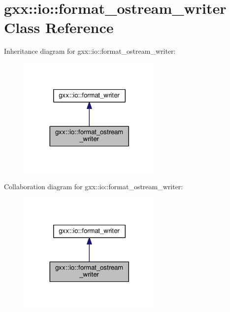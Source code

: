 \hypertarget{classgxx_1_1io_1_1format__ostream__writer}{}\section{gxx\+:\+:io\+:\+:format\+\_\+ostream\+\_\+writer Class Reference}
\label{classgxx_1_1io_1_1format__ostream__writer}


Inheritance diagram for gxx\+:\+:io\+:\+:format\+\_\+ostream\+\_\+writer\+:
\nopagebreak
\begin{figure}[H]
\begin{center}
\leavevmode
\includegraphics[width=200pt]{classgxx_1_1io_1_1format__ostream__writer__inherit__graph}
\end{center}
\end{figure}


Collaboration diagram for gxx\+:\+:io\+:\+:format\+\_\+ostream\+\_\+writer\+:
\nopagebreak
\begin{figure}[H]
\begin{center}
\leavevmode
\includegraphics[width=200pt]{classgxx_1_1io_1_1format__ostream__writer__coll__graph}
\end{center}
\end{figure}

